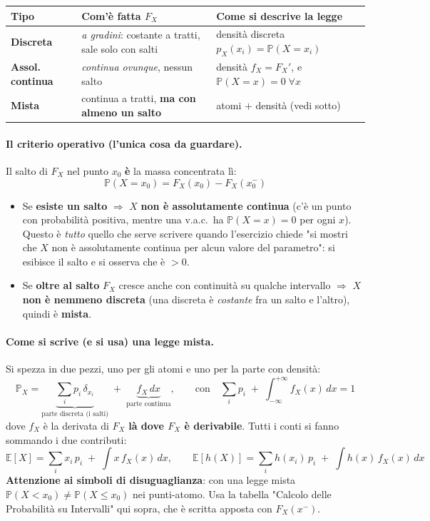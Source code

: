 \documentclass[12pt]{extarticle} %
\begin{document}
\begin{center}
\renewcommand{\arraystretch}{1.7}
\small
\begin{tabular}{|l|l|l|}
\hline
\textbf{Tipo} & \textbf{Com'è fatta $F_X$} & \textbf{Come si descrive la legge} \\ \hline
\textbf{Discreta} & \emph{a gradini}: costante a tratti, sale solo con salti & densità discreta $p_X(x_i) = \mathbb{P}(X = x_i)$ \\ \hline
\textbf{Assol. continua} & \emph{continua ovunque}, nessun salto & densità $f_X = F_X'$, e $\mathbb{P}(X = x) = 0\;\forall x$ \\ \hline
\textbf{Mista} & continua a tratti, \textbf{ma con almeno un salto} & atomi $+$ densità (vedi sotto) \\ \hline
\end{tabular}
\end{center}

\paragraph{Il criterio operativo (l'unica cosa da guardare).} Il salto di $F_X$ nel punto $x_0$ \textbf{è} la massa concentrata lì:
$$ \boxed{\;\mathbb{P}(X = x_0) = F_X(x_0) - F_X(x_0^-)\;} $$
\begin{itemize}
    \item Se \textbf{esiste un salto} $\Rightarrow$ $X$ \textbf{non è assolutamente continua} (c'è un punto con probabilità positiva, mentre una v.a.c.\ ha $\mathbb{P}(X=x)=0$ per ogni $x$). \\ {\footnotesize Questo è \emph{tutto} quello che serve scrivere quando l'esercizio chiede "si mostri che $X$ non è assolutamente continua per alcun valore del parametro": si esibisce il salto e si osserva che è $>0$.}
    \item Se \textbf{oltre al salto} $F_X$ cresce anche con continuità su qualche intervallo $\Rightarrow$ $X$ \textbf{non è nemmeno discreta} (una discreta è \emph{costante} fra un salto e l'altro), quindi è \textbf{mista}.
\end{itemize}

\paragraph{Come si scrive (e si usa) una legge mista.} Si spezza in due pezzi, uno per gli atomi e uno per la parte con densità:
$$ \mathbb{P}_X = \underbrace{\sum_i p_i\, \delta_{x_i}}_{\text{parte discreta (i salti)}} \; + \; \underbrace{f_X \,dx}_{\text{parte continua}}, \qquad \text{con} \quad \sum_i p_i \;+\; \int_{-\infty}^{+\infty} f_X(x)\,dx = 1 $$
dove $f_X$ è la derivata di $F_X$ \textbf{là dove $F_X$ è derivabile}. Tutti i conti si fanno sommando i due contributi:
$$ \mathbb{E}[X] = \sum_i x_i\, p_i \; + \; \int x\, f_X(x)\,dx, \qquad \mathbb{E}[h(X)] = \sum_i h(x_i)\, p_i \; + \; \int h(x)\, f_X(x)\,dx $$
{\footnotesize \textbf{Attenzione ai simboli di disuguaglianza}: con una legge mista $\mathbb{P}(X < x_0) \ne \mathbb{P}(X \le x_0)$ nei punti-atomo. Usa la tabella "Calcolo delle Probabilità su Intervalli" qui sopra, che è scritta apposta con $F_X(x^-)$.}
\end{document}
